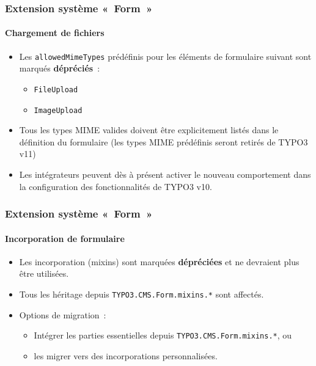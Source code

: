 
\begin{frame}[fragile]
	\frametitle{Extension système «~Form~»}
	\framesubtitle{Chargement de fichiers}

	\begin{itemize}
		\item Les \texttt{allowedMimeTypes} prédéfinis pour les éléments de formulaire
			suivant sont marqués \textbf{dépréciés}~:

			\begin{itemize}
				\item \texttt{FileUpload}
				\item \texttt{ImageUpload}
			\end{itemize}

		\item Tous les types MIME valides doivent être explicitement listés dans le définition du formulaire\newline
			\smaller
				(les types MIME prédéfinis seront retirés de TYPO3 v11)
			\normalsize

		\item Les intégrateurs peuvent dès à présent activer le nouveau comportement dans la configuration
			des fonctionnalités de TYPO3 v10.

	\end{itemize}

\end{frame}


\begin{frame}[fragile]
	\frametitle{Extension système «~Form~»}
	\framesubtitle{Incorporation de formulaire}

	\begin{itemize}
		\item Les incorporation (mixins) sont marquées \textbf{dépréciées} et ne devraient plus être utilisées.
		\item Tous les héritage depuis \texttt{TYPO3.CMS.Form.mixins.*} sont affectés.
		\item Options de migration~:

			\begin{itemize}
				\item Intégrer les parties essentielles depuis \texttt{TYPO3.CMS.Form.mixins.*}, ou
				\item les migrer vers des incorporations personnalisées.
			\end{itemize}

	\end{itemize}

\end{frame}

